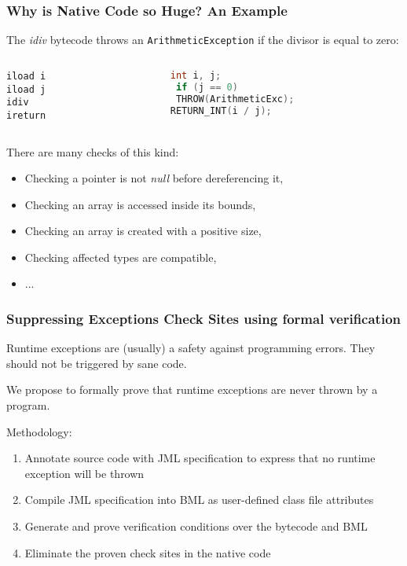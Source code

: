\documentclass{beamer}
\begin{document}
\begin{frame}[fragile]\frametitle{Why is Native Code so Huge? An Example}
The \emph{idiv} bytecode throws an \texttt{ArithmeticException} if the divisor is equal to zero:

\begin{columns}
\begin{column}{5.1cm}
\begin{lstlisting}[language=jvmis]
iload i
iload j
idiv
ireturn
\end{lstlisting}
\end{column}
\begin{column}{5.1cm}
\begin{lstlisting}[language=C]
int i, j;
 if (j == 0)
 THROW(ArithmeticExc);
RETURN_INT(i / j);
\end{lstlisting}
\end{column}
\end{columns}
\bigskip
There are many checks of this kind:
\begin{itemize}
\item Checking a pointer is not \emph{null} before dereferencing it,
\item Checking an array is accessed inside its bounds,
\item Checking an array is created with a positive size,
\item Checking affected types are compatible,
\item ...
\end{itemize}
\end{frame}


\begin{frame}\frametitle{Suppressing Exceptions Check Sites using formal verification}

Runtime exceptions are (usually) a safety against programming errors. They should not be triggered by sane code.

We propose to formally prove that runtime exceptions are never thrown by a program.

Methodology:
\begin{enumerate}
\item Annotate source code with JML specification to express that no runtime exception will be thrown
\item Compile JML specification into BML as user-defined class file attributes
\item Generate and prove verification conditions over the bytecode and BML
\item Eliminate the proven check sites in the native code
\end{enumerate}
\end{frame}
\end{document}
